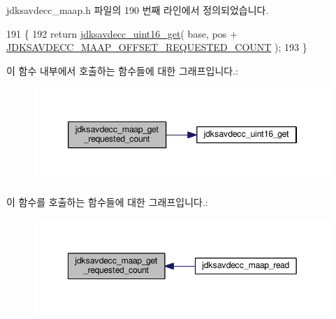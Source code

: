 jdksavdecc\+\_\+maap.\+h 파일의 190 번째 라인에서 정의되었습니다.


\begin{DoxyCode}
191 \{
192     \textcolor{keywordflow}{return} \hyperlink{group__endian_ga3fbbbc20be954aa61e039872965b0dc9}{jdksavdecc\_uint16\_get}( base, pos + 
      \hyperlink{group__maap_ga2ae31eb4ee8d271ba09c3ddfac65c0ce}{JDKSAVDECC\_MAAP\_OFFSET\_REQUESTED\_COUNT} );
193 \}
\end{DoxyCode}


이 함수 내부에서 호출하는 함수들에 대한 그래프입니다.\+:
\nopagebreak
\begin{figure}[H]
\begin{center}
\leavevmode
\includegraphics[width=346pt]{group__maap_ga5fe709a6899411d9c88706a26b7afc2e_cgraph}
\end{center}
\end{figure}




이 함수를 호출하는 함수들에 대한 그래프입니다.\+:
\nopagebreak
\begin{figure}[H]
\begin{center}
\leavevmode
\includegraphics[width=349pt]{group__maap_ga5fe709a6899411d9c88706a26b7afc2e_icgraph}
\end{center}
\end{figure}


